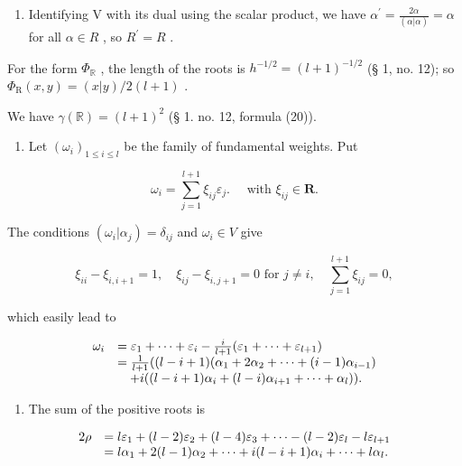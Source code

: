 \begin{enumerate}
\def\labelenumi{(\Alph{enumi})}
\setcounter{enumi}{21}
\tightlist
\item
  Identifying V with its dual using the scalar product, we have \(\alpha^{\prime} = \frac{2\alpha}{(\alpha|\alpha)} = \alpha\) for all \(\alpha \in R\) , so \(R^{\prime} = R\) .
\end{enumerate}

For the form \(\Phi_{\mathbb{R}}\) , the length of the roots is \(h^{-1/2} = (l + 1)^{-1/2}\) (§ 1, no. 12); so \(\Phi_{\mathrm{R}}(x,y) = (x|y)/2(l+1)\) .

We have \(\gamma (\mathbb{R}) = (l + 1)^2\) (§ 1. no. 12, formula (20)).

\begin{enumerate}
\def\labelenumi{(\Roman{enumi})}
\setcounter{enumi}{5}
\tightlist
\item
  Let \((\omega_{i})_{1\leqslant i\leqslant l}\) be the family of fundamental weights. Put
\end{enumerate}

\[
\omega_ {i} = \sum_ {j = 1} ^ {l + 1} \xi_ {i j} \varepsilon_ {j}. \quad \text { with } \xi_ {i j} \in \mathbf {R}.
\]

The conditions \((\omega_{i}|\alpha_{j}) = \delta_{ij}\) and \(\omega_{i}\in V\) give

\[
\xi_ {i i} - \xi_ {i, i + 1} = 1, \quad \xi_ {i j} - \xi_ {i, j + 1} = 0 \text {   for   } j \neq i, \quad \sum_ {j = 1} ^ {l + 1} \xi_ {i j} = 0,
\]

which easily lead to

\[
\begin{array}{r l} \omega_ {i} & = \varepsilon_ {1} + \dots + \varepsilon_ {i} - \frac {i}{l + 1} (\varepsilon_ {1} + \dots + \varepsilon_ {l + 1}) \\ & = \frac {1}{l + 1} ((l - i + 1) (\alpha_ {1} + 2 \alpha_ {2} + \dots + (i - 1) \alpha_ {i - 1}) \\ & \quad + i ((l - i + 1) \alpha_ {i} + (l - i) \alpha_ {i + 1} + \dots + \alpha_ {l})). \end{array}
\]

\begin{enumerate}
\def\labelenumi{(\Roman{enumi})}
\setcounter{enumi}{6}
\tightlist
\item
  The sum of the positive roots is
\end{enumerate}

\[
\begin{array}{r l} 2 \rho & = l \varepsilon_ {1} + (l - 2) \varepsilon_ {2} + (l - 4) \varepsilon_ {3} + \dots - (l - 2) \varepsilon_ {l} - l \varepsilon_ {l + 1} \\ & = l \alpha_ {1} + 2 (l - 1) \alpha_ {2} + \dots + i (l - i + 1) \alpha_ {i} + \dots + l \alpha_ {l}. \end{array}
\]

